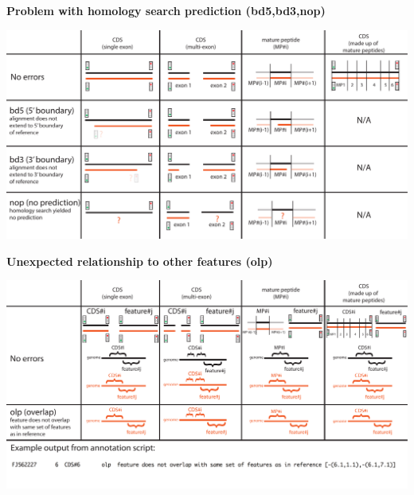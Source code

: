 \documentclass[landscape]{slides}
\begin{document}
\begin{slide}
\begin{center}
\textbf{Problem with homology search prediction (bd5,bd3,nop)}
\vspace{0.5in}

\includegraphics[width=10in]{figs/error-4-bd5-bd3-nop}
\end{center}
\vfill
\end{slide}
\begin{slide}
\begin{center}
\textbf{Unexpected relationship to other features (olp)}
\vspace{0.5in}

\includegraphics[width=10in]{figs/errornew-3-olp}
\end{center}
\vfill
\end{slide}
\end{document}
